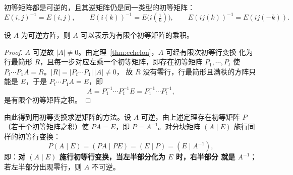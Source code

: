 初等矩阵都是可逆的，且其逆矩阵仍是同一类型的初等矩阵：
\[
  E(i,j)^{-1}=E(i,j),\qquad
  E(i(k))^{-1}=E\big(i(\tfrac{1}{k})\big),\qquad
  E(ij(k))^{-1}=E(ij(-k)).
\]

\begin{theorem}\label{thm:elem-product}
设 $A$ 为可逆方阵，则 $A$ 可以表示为有限个初等矩阵的乘积。
\end{theorem}
\begin{proof}
$A$ 可逆故 $|A|\neq 0$。由定理~\ref{thm:echelon}，$A$ 可经有限次初等行变换
化为行最简形 $R$，且每一步对应左乘一个初等矩阵，即存在初等矩阵
$P_1,\cdots,P_t$ 使 $P_t\cdots P_1A=R$。$|R|=|P_t\cdots P_1|\,|A|\neq 0$，
故 $R$ 没有零行，行最简形且满秩的方阵只能是 $E$，于是
$P_t\cdots P_1A=E$，即
\[
  A=P_1^{-1}\cdots P_t^{-1}E=P_1^{-1}\cdots P_t^{-1},
\]
是有限个初等矩阵之积。
\end{proof}

由此得到用初等变换求逆矩阵的方法。设 $A$ 可逆，由上述定理存在初等矩阵
$P$（若干个初等矩阵之积）使 $PA=E$，即 $P=A^{-1}$。对分块矩阵
$(A\mid E)$ 施行同样的初等行变换：
\[
  P(A\mid E)=(PA\mid PE)=(E\mid P)=(E\mid A^{-1}),
\]
即：\textbf{对 $(A\mid E)$ 施行初等行变换，当左半部分化为 $E$ 时，右半部分
就是 $A^{-1}$}；若左半部分出现零行，则 $A$ 不可逆。

